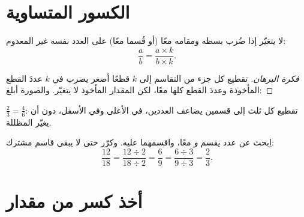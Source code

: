 \section{الكسور المتساوية}

\begin{proposition}\label{prop:g6:fractions:equal}
لا يتغيّر  إذا ضُرب بسطه ومقامه معًا (أو قُسما معًا) على العدد
نفسه غير المعدوم:
\[
\frac{a}{b} = \frac{a \times k}{b \times k} .
\]
\end{proposition}

\begin{proof}[فكرة البرهان]
تقطيع كل جزء من التقاسم إلى $k$ قطعًا أصغر يضرب في $k$ عددَ القطع
المأخوذة وعددَ القطع كلها معًا، لكن المقدار المأخوذ لا يتغيّر.
والصورة أبلغ:
\end{proof}

\begin{omfigure}

{\small $\frac23 = \frac46$: تقطيع كل ثلث إلى قسمين يضاعف
العددين، في الأعلى وفي الأسفل، دون أن يغيّر  المظللة.}
\end{omfigure}

\begin{method}\label{met:g6:fractions:simplify}
اِبحث عن عدد يقسم  \emph{و}  معًا، واقسمهما عليه.
وكرّر حتى لا يبقى قاسم مشترك:
\[
\frac{12}{18} = \frac{12 \div 2}{18 \div 2} = \frac{6}{9}
= \frac{6 \div 3}{9 \div 3} = \frac{2}{3}.
\]
\end{method}

\section{أخذ كسر من مقدار}

